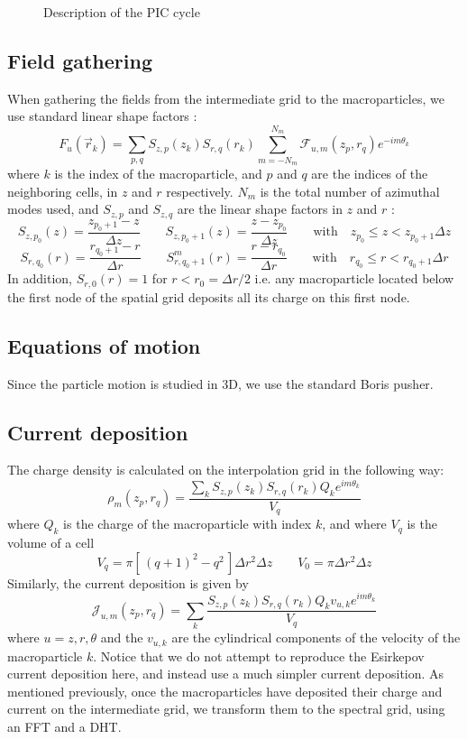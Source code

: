 \documentclass[a4paper]{article}   	%
\begin{document}
\begin{figure}

\caption{Description of the PIC cycle \label{fig:GlobalScheme}}
\end{figure}

\subsection{Field gathering}

When gathering the fields from the intermediate grid to the macroparticles,
we use standard linear shape factors :
\[ F_u(\vec{r}_k) =  \sum_{p,q} S_{z,p}(z_k)
S_{r,q}(r_k) \sum_{m=-N_m}^{N_m} \mathcal{F}_{u,m}(z_p, r_q) e^{-im\theta_k} \]
where $k$ is the index of the macroparticle, and $p$ and $q$ are the
indices of the neighboring cells, in $z$ and $r$ respectively. $N_m$ is the total number
of azimuthal modes used, and $S_{z,p}$ and $S_{z,q}$ are the linear
shape factors in $z$ and $r$ :
\[ S_{z,p_0}(z) = \frac{z_{p_0+1}- z}{\Delta z}  \qquad 
S_{z,p_0 +1}(z) = \frac{ z - z_{p_0} }{\Delta z} \qquad
\mathrm{with} \quad z_{p_0} \leq z < z_{p_0 +1} \Delta z \]
\[ S_{r,q_0}(r) = \frac{ r_{q_0+1} - r }{  \Delta r }
\qquad S^m_{r,q_0+1}(r) = \frac{ r - r_{q_0} }{  \Delta r }
\qquad \mathrm{with} \quad r_{q_0} \leq r < r_{q_0+1}
\Delta r \]
In addition, $S_{r,0}(r) = 1$ for $r< r_0 = \Delta r/2$ i.e. any macroparticle
located below the first node of the spatial grid deposits all its charge on
this first node.

\subsection{Equations of motion}

Since the particle motion is studied in 3D, we use the standard Boris pusher.

\subsection{Current deposition}

The charge density is calculated on the interpolation grid in the
following way:
\[ \mathcal{\rho}_m(z_p,r_q) = \frac{ \sum_k  S_{z,p}(z_k)S_{r,q}(r_k) Q_k e^{im\theta_k}}{V_{q}} \]
where $Q_k$ is the charge of the macroparticle with index $k$, and
where $V_q$ is the volume of a cell
\[ V_{q} = \pi [\, (q+1)^2- q^2\,] \Delta r^2 \Delta z  \qquad
V_{0} = \pi \Delta r^2 \Delta z \]
Similarly, the current deposition is given by
\[ \mathcal{J}_{u,m}(z_p,r_q) = \sum_k  \frac{S_{z,p}(z_k) S_{r,q}(r_k)
Q_k v_{u,k} e^{im\theta_k}}{V_{q}} \]
where $u = z,r,\theta$ and the $v_{u,k}$ are the cylindrical components of the
velocity of the macroparticle $k$. Notice that we do not attempt to
reproduce the Esirkepov current deposition here, and instead use a
much simpler current deposition. As mentioned previously, once the
macroparticles have deposited their charge and current on the
intermediate grid, we transform them to the spectral grid, using an
FFT and a DHT.
\end{document}
